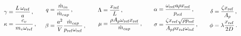 ~
\begin{equation*}
    \begin{tabular}{p{2.1cm} p{2.8cm} p{3cm} p{3cm} p{2cm}}
        $ \begin{aligned}
            \gamma &= \frac{L \, \omega_{\rm{ref}}}{a}  \, , \\
            \kappa &= \frac{c_v}{m_v \omega_{\rm{ref}}} \, ,
        \end{aligned} $
        &
        $ \begin{aligned}
            q &= \frac{\dot{m}_{in}}{\dot{m}_{cap}} \, , \\
            \beta &= \frac{a^2}{V} \frac{\dot{m}_{cap}}{p_{\rm{ref}} \omega_{\rm{ref}}} \, ,
        \end{aligned} $
        &
        $ \begin{aligned}
            \Lambda &= \frac{x_{\rm{ref}}}{L} \, , \\
            \mu &= \frac{\rho A_p \omega_{\rm{ref}} x_{\rm{ref}}}{\dot{m}_{cap}} \, ,
        \end{aligned} $
        &
        $ \begin{aligned}
            \alpha &= \frac{\omega_{\rm{ref}} a \rho x_{\rm{ref}}}{p_{\rm{ref}}} \, , \\
            \sigma &= \frac{\zeta x_{\rm{ref}} \sqrt{\rho p_{\rm{ref}}}}{A_p \rho x_{\rm{ref}} \omega_{\rm{ref}}} \, ,
        \end{aligned} $
        &
        $ \begin{aligned}
            \delta &= \frac{\zeta x_{\rm{ref}}}{A_p} \, , \\
            \phi &= \lambda \frac{x_{\rm{ref}}}{2D} \, .
        \end{aligned} $
    \end{tabular}
\end{equation*}

